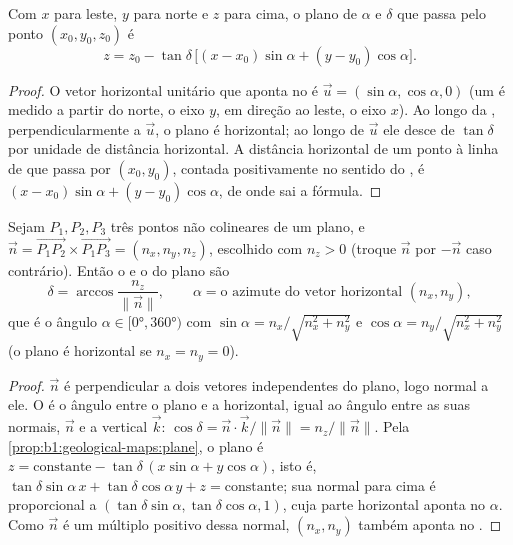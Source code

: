 \begin{proposition}\label{prop:b1:geological-maps:plane}
Com $x$ para leste, $y$ para norte e $z$ para cima, o plano de 
$\alpha$ e  $\delta$ que passa pelo ponto $(x_0, y_0, z_0)$ é
\[
  z = z_0 - \tan\delta\,\bigl[(x - x_0)\sin\alpha + (y - y_0)\cos\alpha\bigr].
\]
\end{proposition}

\begin{proof}
O vetor horizontal unitário que aponta no  é $\vec u = (\sin\alpha, \cos\alpha, 0)$ (um  é medido a partir do norte, o eixo $y$, em direção ao leste, o eixo $x$). Ao longo da , perpendicularmente a $\vec u$, o plano é horizontal; ao longo de $\vec u$ ele desce de $\tan\delta$ por unidade de distância horizontal. A distância horizontal de um ponto à linha de  que passa por $(x_0, y_0)$, contada positivamente no sentido do , é $(x-x_0)\sin\alpha + (y-y_0)\cos\alpha$, de onde sai a fórmula.
\end{proof}

\begin{theorem}\label{thm:b1:geological-maps:three-point}
Sejam $P_1, P_2, P_3$ três pontos não colineares de um plano, e
$\vec n = \overrightarrow{P_1P_2} \times \overrightarrow{P_1P_3} =
(n_x, n_y, n_z)$, escolhido com $n_z > 0$ (troque $\vec n$ por $-\vec n$
caso contrário). Então o  e o  do plano são
\[
  \delta = \arccos\frac{n_z}{\|\vec n\|}, \qquad
  \alpha = \text{o azimute do vetor horizontal } (n_x, n_y),
\]
que é o ângulo $\alpha \in [\ang{0}, \ang{360})$ com
$\sin\alpha = n_x/\sqrt{n_x^2+n_y^2}$ e $\cos\alpha = n_y/\sqrt{n_x^2+n_y^2}$
(o plano é horizontal se $n_x = n_y = 0$).
\end{theorem}

\begin{proof}
$\vec n$ é perpendicular a dois vetores independentes do plano, logo normal a ele. O  é o ângulo entre o plano e a horizontal,
igual ao ângulo entre as suas normais, $\vec n$ e a vertical
$\vec k$: $\cos\delta = \vec n \cdot \vec k / \|\vec n\| = n_z/\|\vec n\|$.
Pela \cref{prop:b1:geological-maps:plane}, o plano é $z = \text{constante} -
\tan\delta\,(x\sin\alpha + y\cos\alpha)$, isto é,
$\tan\delta\sin\alpha\,x + \tan\delta\cos\alpha\,y + z = \text{constante}$; sua
normal para cima é proporcional a $(\tan\delta\sin\alpha,
\tan\delta\cos\alpha, 1)$, cuja parte horizontal aponta no 
$\alpha$. Como $\vec n$ é um múltiplo positivo dessa normal, $(n_x, n_y)$
também aponta no .
\end{proof}

